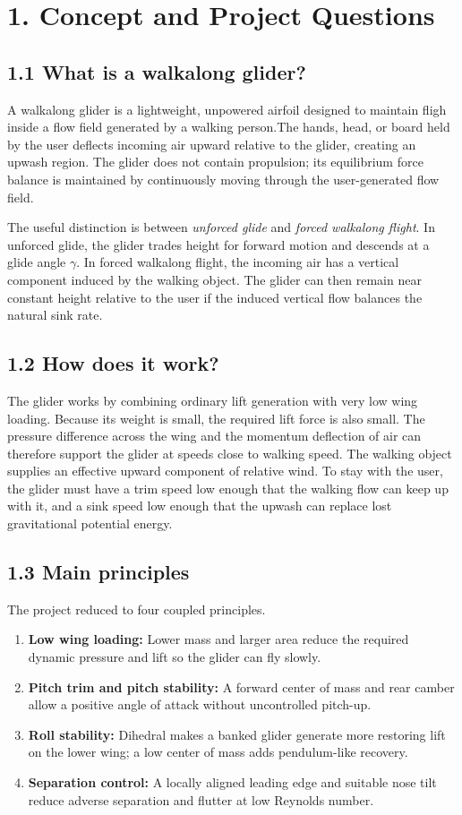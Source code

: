 \documentclass[10pt]{article}
\newcommand{\pagehead}[1]{\section*{#1}\addcontentsline{toc}{section}{#1}}
\begin{document}
\pagehead{1. Concept and Project Questions}

\subsection*{1.1 What is a walkalong glider?}
A walkalong glider is a lightweight, unpowered airfoil designed to maintain fligh inside a flow field generated by a walking person.The hands, head, or board held by the user deflects incoming air upward relative to the glider, creating an upwash region. The glider does not contain propulsion; its equilibrium force balance is maintained by continuously moving through the user-generated flow field.

The useful distinction is between \textit{unforced glide} and \textit{forced walkalong flight}. In unforced glide, the glider trades height for forward motion and descends at a glide angle $\gamma$. In forced walkalong flight, the incoming air has a vertical component induced by the walking object. The glider can then remain near constant height relative to the user if the induced vertical flow balances the natural sink rate.

\subsection*{1.2 How does it work?}
The glider works by combining ordinary lift generation with very low wing loading. Because its weight is small, the required lift force is also small. The pressure difference across the wing and the momentum deflection of air can therefore support the glider at speeds close to walking speed. The walking object supplies an effective upward component of relative wind. To stay with the user, the glider must have a trim speed low enough that the walking flow can keep up with it, and a sink speed low enough that the upwash can replace lost gravitational potential energy.

\subsection*{1.3 Main principles}
The project reduced to four coupled principles.
\begin{enumerate}
\item \textbf{Low wing loading:} Lower mass and larger area reduce the required dynamic pressure and lift so the glider can fly slowly.
\item \textbf{Pitch trim and pitch stability:} A forward center of mass and rear camber allow a positive angle of attack without uncontrolled pitch-up.
\item \textbf{Roll stability:} Dihedral makes a banked glider generate more restoring lift on the lower wing; a low center of mass adds pendulum-like recovery.
\item \textbf{Separation control:} A locally aligned leading edge and suitable nose tilt reduce adverse separation and flutter at low Reynolds number.
\end{enumerate}
\end{document}
